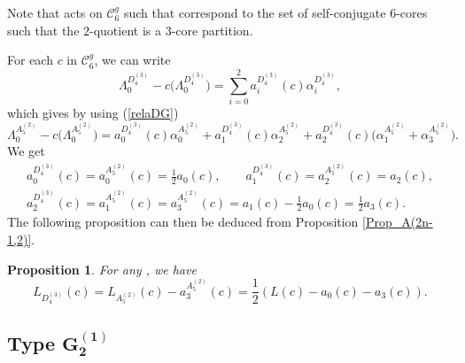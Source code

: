 \documentclass[10pt,a4paper]{amsart}
\newtheorem{Proposition}[Theorem]{Proposition}
 { \theoremstyle{definition}
\newtheorem{Definition}[Theorem]{Definition}
\newtheorem{Note}[Theorem]{Note}
\newtheorem{Example}[Theorem]{Example}
\newtheorem{Remark}[Theorem]{Remark} }
\numberwithin{equation}{section}
\begin{document}
\begin{Remark}%
Note that  acts on $\mathcal{C}_{6}^{g}$ such that  correspond to the set of self-conjugate $6$-cores such that the $2$-quotient is a $3$-core partition.
\end{Remark}

For each $c$ in $\mathcal{C}_{6}^{g}$, we can write%
\begin{equation*}
\Lambda _{0}^{D_{4}^{(3)}}-c\bigl(\Lambda
_{0}^{D_{4}^{(3)}}\bigr)=\sum_{i=0}^{2}a_{i}^{D_{4}^{(3)}}(c)\alpha
_{i}^{D_{4}^{(3)}},
\end{equation*}%
which gives by using (\ref{relaDG})%
\begin{equation*}
\Lambda _{0}^{A_{5}^{(2)}}-c\bigl(\Lambda
_{0}^{A_{5}^{(2)}}\bigr)=a_{0}^{D_{4}^{(3)}}(c)\alpha
_{0}^{A_{5}^{(2)}}+a_{1}^{D_{4}^{(3)}}(c)\alpha
_{2}^{A_{5}^{(2)}}+a_{2}^{D_{4}^{(3)}}(c)\bigl(\alpha _{1}^{A_{5}^{(2)}}+\alpha
_{3}^{A_{5}^{(2)}}\bigr).
\end{equation*}%
We get%
\begin{gather*}
a_{0}^{D_{4}^{(3)}}(c)=a_{0}^{A_{5}^{(2)}}(c)=\frac{1}{2}a_{0}(c), \qquad
a_{1}^{D_{4}^{(3)}}(c)=a_{2}^{A_{5}^{(2)}}(c)=a_{2}(c), \\
a_{2}^{D_{4}^{(3)}}(c)=a_{1}^{A_{5}^{(2)}}(c)=a_{3}^{A_{5}^{(2)}}(c)=a_{1}(c)-
\frac{1}{2}a_{0}(c)=\frac{1}{2}a_{3}(c).
\end{gather*}
The following proposition can then be deduced from Proposition \ref{Prop_A(2n-1,2)}.

\begin{Proposition}
\label{Prop_D(4,3)}	For any , we have
	\begin{equation*}
	L_{D_{4}^{(3)}}(c)=L_{A_{5}^{(2)}}(c)-a_{3}^{A_{5}^{(2)}}(c)=\frac{1}{2}
	(L(c)-a_{0}(c)-a_{3}(c)).
	\end{equation*}
\end{Proposition}

\subsection[Type G\_2\^{}(1)]{Type $\boldsymbol{G_{2}^{(1)}}$}
\end{document}
